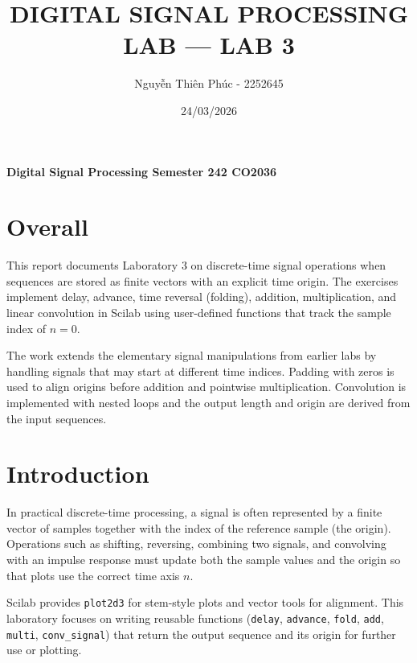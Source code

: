 \documentclass[12pt,a4paper]{article}
\title{\textbf{DIGITAL SIGNAL PROCESSING LAB --- LAB 3}}
\author{
Nguyễn Thiên Phúc - 2252645
}
\date{24/03/2026}
\begin{document}
\maketitle

\begin{center}
\textbf{Digital Signal Processing Semester 242 CO2036}
\end{center}

\vspace{1cm}

\section*{Overall}
This report documents Laboratory 3 on discrete-time signal operations when sequences are stored as finite vectors with an explicit time origin. The exercises implement delay, advance, time reversal (folding), addition, multiplication, and linear convolution in Scilab using user-defined functions that track the sample index of $n=0$.

The work extends the elementary signal manipulations from earlier labs by handling signals that may start at different time indices. Padding with zeros is used to align origins before addition and pointwise multiplication. Convolution is implemented with nested loops and the output length and origin are derived from the input sequences.

\section{Introduction}
In practical discrete-time processing, a signal is often represented by a finite vector of samples together with the index of the reference sample (the origin). Operations such as shifting, reversing, combining two signals, and convolving with an impulse response must update both the sample values and the origin so that plots use the correct time axis $n$.

Scilab provides \texttt{plot2d3} for stem-style plots and vector tools for alignment. This laboratory focuses on writing reusable functions (\texttt{delay}, \texttt{advance}, \texttt{fold}, \texttt{add}, \texttt{multi}, \texttt{conv\_signal}) that return the output sequence and its origin for further use or plotting.
\end{document}
